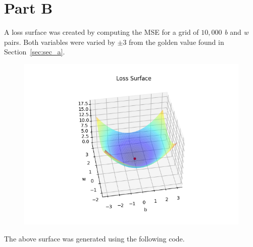 \newpage
\section{Part B}
\label{sec:sec_b}
A loss surface was created by computing the MSE for a grid of $10,000$ \textit{b} and \textit{w} pairs. Both variables were varied by $\pm3$ from the golden value found in Section~\ref{sec:sec_a}.

\begin{figure}[htpb]
	\centering
	\includegraphics[width=\columnwidth]{figures/loss_surface.png}
	\label{fig:loss_surface}
\end{figure}

The above surface was generated using the following code.
